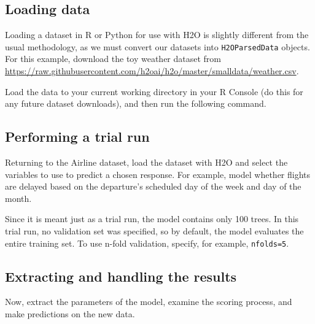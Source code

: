 \subsection{Loading data}

Loading a dataset in R or Python for use with H2O is slightly different from the usual methodology, as we must convert
our datasets into \texttt{H2OParsedData} objects. For this example, download the toy weather dataset from
{\url{https://raw.githubusercontent.com/h2oai/h2o/master/smalldata/weather.csv}}.

\waterExampleInR
Load the data to your current working directory in your R Console (do this for any future dataset downloads), and then run the following command.


\waterExampleInPython



\subsection{Performing a trial run}
Returning to the Airline dataset, load the dataset with H2O and select the variables to use to predict a chosen
response. For example, model whether flights are delayed based on the departure's scheduled day of the week and day of
the month.

\waterExampleInR


\waterExampleInPython



\noindent
Since it is meant just as a trial run, the model contains only 100 trees. In this trial run, no validation set was
specified, so by default, the model evaluates the entire training set.  To use n-fold validation, specify, for example,
\texttt{nfolds=5}.

\subsection{Extracting and handling the results}

Now, extract the parameters of the model, examine the scoring process, and make predictions on the new data.

\waterExampleInR


\waterExampleInPython


